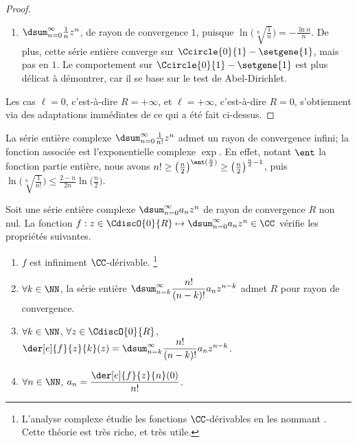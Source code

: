 \begin{proof}
\begin{itemize}
\begin{enumerate}[label=(\alph*)]
	        \item $\dsum_{n=0}^{\infty}  \frac{1}{n} z^n$, 
	        de rayon de convergence $1$,
	        puisque 
	        $ \ln \big( \sqrt[n]{\frac{1}{n}} \big)
	        = -\frac{\ln n}{n}$.
	        De plus,
	        cette série entière converge sur $\Ccircle{0}{1} - \setgene{1}$, mais pas en $1$. 
	        Le comportement sur $\Ccircle{0}{1} - \setgene{1}$ est plus délicat à démontrer, car il se base sur le test de Abel-Dirichlet.
	    \end{enumerate}
    \end{itemize}


    Les cas
    $\ell = 0$, c'est-à-dire $R = +\infty$,
    et
    $\ell = +\infty$, c'est-à-dire $R = 0$,
    s'obtiennent via des adaptations immédiates de ce qui a été fait ci-dessus.
\end{proof}


\begin{example}
	La série entière complexe $\dsum_{n=0}^{\infty} \frac{1}{n!} z^n$ admet un rayon de convergence infini; la fonction associée est l'exponentielle complexe $\exp$.
	En effet,
	notant $\ent$ la fonction partie entière, nous avons
	$n! \geq \big( \frac{n}{2} \big)^{\ent (\frac{n}{2})} \geq \big( \frac{n}{2} \big)^{\frac{n}{2} - 1}$,
	puis
	$ \ln \big( \sqrt[n]{\frac{1}{n!}} \big)
	\leq
	  \frac{2 - n}{2 n} \ln \big( \frac{n}{2} \big)$.
\end{example}




\begin{preli} \label{der-power-serie}
    Soit une série entière complexe $\dsum_{n=0}^{\infty} a_n z^n$ de rayon de convergence $R$ non nul.
    La fonction $f: z \in \CdiscO{0}{R} \mapsto \dsum_{n=0}^{\infty} a_n z^n \in \CC$ vérifie les propriétés suivantes.
    \begin{enumerate}
    	\item $f$ est infiniment $\CC$-dérivable.%
		\footnote{
			L'analyse complexe étudie les fonctions $\CC$-dérivables en les nommant .
			Cette théorie est très riche, et très utile. 
		}

    	\item $\forall k \in \NN$,
		la série entière $\dsum_{n = k}^{\infty} \dfrac{n!}{(n-k)!} a_n z^{n - k}$ admet $R$ pour rayon de convergence.

    	\item $\forall k \in \NN$, $\forall z \in \CdiscO{0}{R}$,
		$\der[e]{f}{z}{k}(z) = \dsum_{n = k}^{\infty} \dfrac{n!}{(n-k)!} a_n z^{n - k}$.

    	\item \label{a_n-value}
		$\forall n \in \NN$,  $a_n = \dfrac{\der[e]{f}{z}{n}(0)}{n!}$.
    \end{enumerate}
\end{preli}


